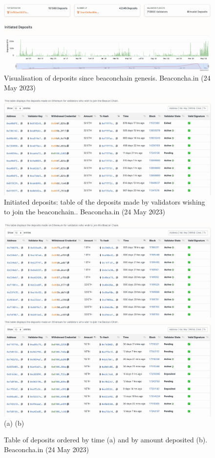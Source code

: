 \documentclass[UTF8]{article}
\begin{document}
{\begin{figure}[htbp]
\begin{center}
\includegraphics[width=0.9\linewidth]{images/bdeposits}
\caption{Visualisation of deposits since beaconchain genesis. Beaconcha.in (24 May 2023)}
\label{fig:bdeposits}
\end{center}
\end{figure}

\begin{figure}[htbp]
\begin{center}
\includegraphics[width=0.9\linewidth]{images/bdeposittbl}
\caption{Initiated deposits: table of the deposits made by validators wishing to join the beaconchain.. Beaconcha.in (24 May 2023)}
\label{fig:bdeposittbl}
\end{center}
\end{figure}

\begin{figure}[htbp]
\begin{center}
\includegraphics[width=0.48\linewidth]{images/bdeposittbltime}
\includegraphics[width=0.48\linewidth]{images/bdeposittblamount} \\
(a)\hspace{160pt}        (b)\\
\caption{Table of deposits ordered by time (a) and by amount deposited (b). Beaconcha.in (24 May 2023)}
\label{fig:bdeposittbltime}
\end{center}
\end{figure}

}
\end{document}
